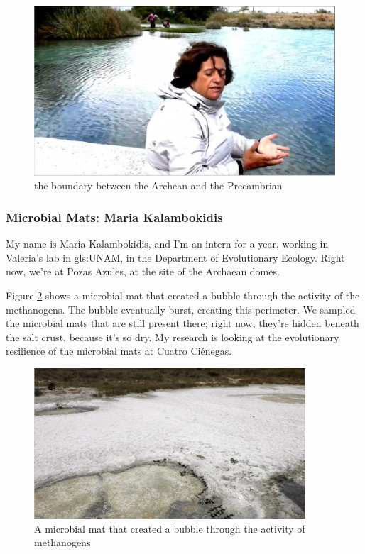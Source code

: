 \documentclass[]{article}
\begin{document}
\begin{figure}[H]
	\caption[ the boundary between the Archean and the Precambrian]{the boundary between the Archean and the Precambrian}\label{fig:boundary:precambrian}
	\includegraphics[width=\textwidth]{CuatroCienegas12}
\end{figure}

\subsubsection{Microbial Mats: Maria Kalambokidis}
My name is Maria Kalambokidis, and I'm an intern for a year, working in Valeria's lab in \gls{gls:UNAM}, in the Department of Evolutionary Ecology. Right now, we're at Pozas Azules, at the site of the Archaean domes. 

Figure \ref{fig:CuatroCienegas:microvial:mat}  shows a microbial mat that created a bubble through the activity of the methanogens. The bubble eventually burst, creating this perimeter. We sampled the microbial mats that are still present there; right now, they're hidden beneath the salt crust, because it's so dry. My research is looking at the evolutionary resilience of the microbial mats at Cuatro Ci\'enegas.

\begin{figure}[H]
	\caption[A microbial mat showing the activity of  methanogens]{A microbial mat that created a bubble through the activity of  methanogens}\label{fig:CuatroCienegas:microvial:mat}
	\includegraphics[width=0.9\textwidth]{CuatroCienegas3}
\end{figure}
\end{document}

